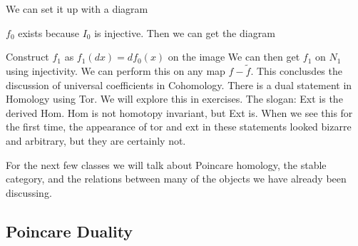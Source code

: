 \documentclass[10pt]{article}
\theoremstyle{definition}
\begin{document}
	We can set it up with a diagram
	\begin{center}
	\end{center}
	$f_0$ exists because $I_0$ is injective. Then we can get the diagram
	\begin{center}
	\end{center}
	Construct $f_1$ as $f_1(dx)=df_0(x)$ on the image We can then get $f_1$ on $N_1$ using injectivity. We can perform this on any map $f-\tilde f$. This conclusdes the discussion of universal coefficients in Cohomology. There is a dual statement in Homology using Tor. We will explore this in exercises. The slogan: Ext is the derived Hom. Hom is not homotopy invariant, but Ext is. When we see this for the first time, the appearance of tor and ext in these statements looked bizarre and arbitrary, but they are certainly not.  
	
	For the next few classes we will talk about Poincare homology, the stable category, and the relations between many of the objects we have already been discussing. 
	\subsection{Poincare Duality}
	
\end{document}
